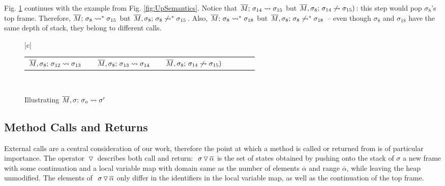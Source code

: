  
 
 Fig. \ref{fig:UpSemanticsBounded}  continues with the example from  Fig. \ref{fig:UpSemantics}. Notice that $\leadstoOrig {\Mtwo} {\sigma_{14}}  {\sigma_{15}}$ 
 but    $\notLeadstoBounded  {\Mtwo}  {\sigma_{14}} {\sigma_8} {\sigma_{15}}$:  this step would pop  $\sigma_8$'s
 top frame. 
Therefore,   $\leadstoOrigStar {\Mtwo} {\sigma_8}  {\sigma_{15}}$ 
 but  $\notLeadstoBoundedStar {\Mtwo} {\sigma_8} {\sigma_8} {\sigma_{15}}$. Also,
  $\leadstoOrigStar {\Mtwo} {\sigma_8}  {\sigma_{18}}$ 
 but  $\notLeadstoBoundedStar {\Mtwo} {\sigma_8} {\sigma_8} {\sigma_{18}}$  -- even though $\sigma_8$ and $\sigma_{18}$ have the same depth of stack, they belong to different calls.
 

\begin{figure}[htb]
\begin{tabular}{|c|}
 \hline %
 \\
\hline
\begin{tabular}{lclclclcl}
 $\leadstoBounded  {\Mtwo} {\sigma_{12}} {\sigma_8}  {\sigma_{13}} $  & &   $\leadstoBounded  {\Mtwo} {\sigma_{13}}  {\sigma_{8}}  {\sigma_{14}} $ &  &
$\notLeadstoBounded  {\Mtwo} {\sigma_{14}} {\sigma_8}  {\sigma_{15}} $ & &  
\\
\end{tabular}
\\
\hline
\end{tabular}
   \caption{Illustrating   $\leadstoBounded  {\Mtwo} {\sigma_o} {\sigma}  {\sigma'}$}
   \label{fig:UpSemanticsBounded}
 \end{figure}
 
\subsection{Method Calls and Returns}


{External calls are a central consideration of our work, therefore  the point at which a method is called or returned from is of particular importance. 
The operator $\pushSymbol$ describes both call and return:
 $ \PushS  {\alpha} {\sigma} $ is  the set of states obtained by pushing onto the stack of $\sigma$ a new frame with some continuation  and a local variable map with domain same as the number of elements $\overline \alpha$ and range  $\overline \alpha$, while leaving the heap unmodified.
The elements of $ \PushS  {\alpha} {\sigma} $ only differ in the identifiers in the local variable map, as well as the continuation  of the top frame. 
}

